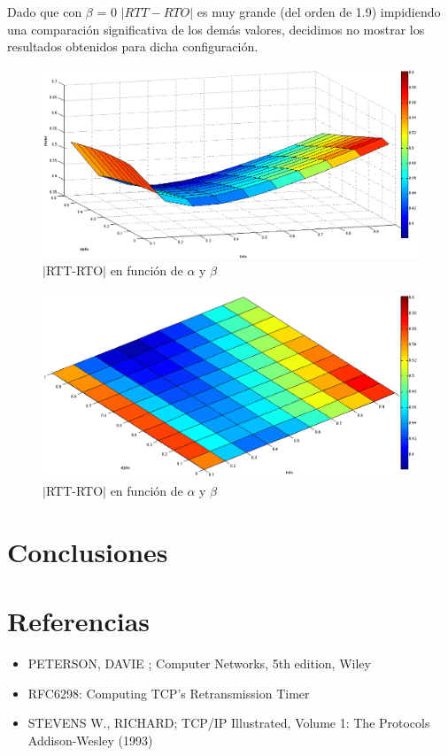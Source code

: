 \documentclass[10pt, a4paper]{article}
\begin{document}
Dado que con $\beta$ = 0 $|RTT-RTO|$ es muy grande (del orden de 1.9) impidiendo una comparación significativa de los demás valores, decidimos no mostrar los resultados obtenidos para dicha configuración.

\begin{figure}[H]
\begin{center}
\includegraphics[width=17cm]{alphaBetaCorteCostado.png}
\caption{$|$RTT-RTO$|$ en función de $\alpha$ y $\beta$}
\end{center}
\end{figure}

\begin{figure}[H]
\begin{center}
\includegraphics[width=17cm]{alpha-beta-dif-SinCeroB.png}
\caption{$|$RTT-RTO$|$ en función de $\alpha$ y $\beta$}
\end{center}
\end{figure}

\section{Conclusiones}


\section{Referencias}
\begin{itemize}
\item PETERSON, DAVIE ; Computer Networks, 5th edition, Wiley

\item{RFC6298: Computing TCP's Retransmission Timer}

\item{STEVENS W., RICHARD; TCP/IP Illustrated, Volume 1: The Protocols Addison-Wesley (1993)}

\end{itemize}
\end{document}
